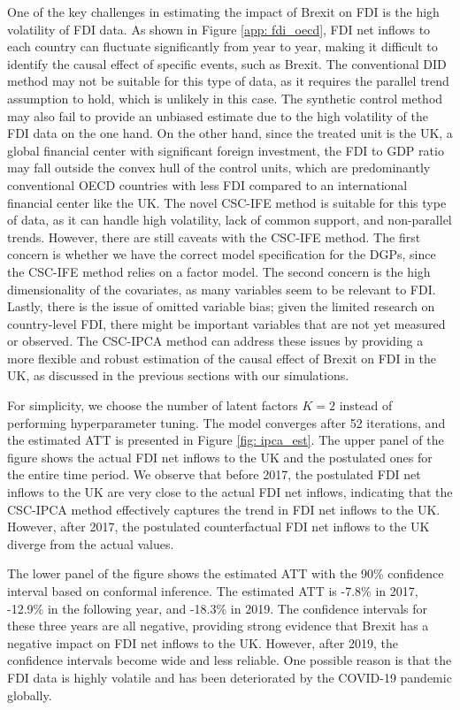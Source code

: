 \documentclass[12pt]{article}
\begin{document}
One of the key challenges in estimating the impact of Brexit on FDI is the high volatility of FDI data. As shown in Figure \ref{app: fdi_oecd}, FDI net inflows to each country can fluctuate significantly from year to year, making it difficult to identify the causal effect of specific events, such as Brexit. The conventional DID method may not be suitable for this type of data, as it requires the parallel trend assumption to hold, which is unlikely in this case. The synthetic control method may also fail to provide an unbiased estimate due to the high volatility of the FDI data on the one hand. On the other hand, since the treated unit is the UK, a global financial center with significant foreign investment, the FDI to GDP ratio may fall outside the convex hull of the control units, which are predominantly conventional OECD countries with less FDI compared to an international financial center like the UK. The novel CSC-IFE method is suitable for this type of data, as it can handle high volatility, lack of common support, and non-parallel trends. However, there are still caveats with the CSC-IFE method. The first concern is whether we have the correct model specification for the DGPs, since the CSC-IFE method relies on a factor model. The second concern is the high dimensionality of the covariates, as many variables seem to be relevant to FDI. Lastly, there is the issue of omitted variable bias; given the limited research on country-level FDI, there might be important variables that are not yet measured or observed. The CSC-IPCA method can address these issues by providing a more flexible and robust estimation of the causal effect of Brexit on FDI in the UK, as discussed in the previous sections with our simulations.

For simplicity, we choose the number of latent factors $K = 2$ instead of performing hyperparameter tuning. The model converges after 52 iterations, and the estimated ATT is presented in Figure \ref{fig: ipca_est}. The upper panel of the figure shows the actual FDI net inflows to the UK and the postulated ones for the entire time period. We observe that before 2017, the postulated FDI net inflows to the UK are very close to the actual FDI net inflows, indicating that the CSC-IPCA method effectively captures the trend in FDI net inflows to the UK. However, after 2017, the postulated counterfactual FDI net inflows to the UK diverge from the actual values. 

The lower panel of the figure shows the estimated ATT with the 90\% confidence interval based on conformal inference. The estimated ATT is -7.8\% in 2017, -12.9\% in the following year, and -18.3\% in 2019. The confidence intervals for these three years are all negative, providing strong evidence that Brexit has a negative impact on FDI net inflows to the UK. However, after 2019, the confidence intervals become wide and less reliable. One possible reason is that the FDI data is highly volatile and has been deteriorated by the COVID-19 pandemic globally.
\end{document}
